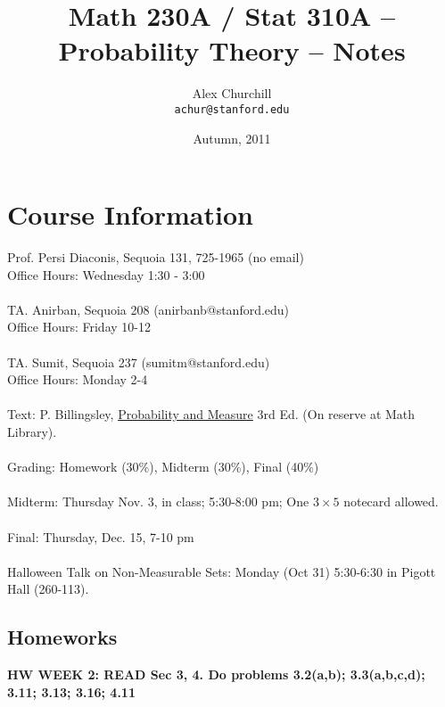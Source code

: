 \documentclass[12pt]{article}
\title{Math 230A / Stat 310A -- Probability Theory -- Notes}
\author{
Alex Churchill\\
\small \texttt{achur@stanford.edu}
}
\date{Autumn, 2011}
\begin{document}
\maketitle
\thispagestyle{empty} %
\tableofcontents


\newpage

\setcounter{page}{1} %

\section{Course Information}
Prof. Persi Diaconis, Sequoia 131, 725-1965 (no email) \\
Office Hours: Wednesday 1:30 - 3:00
\\ \\
TA. Anirban, Sequoia 208 (anirbanb@stanford.edu) \\
Office Hours: Friday 10-12
\\ \\
TA. Sumit, Sequoia 237 (sumitm@stanford.edu) \\
Office Hours: Monday 2-4
\\ \\
Text: P. Billingsley, \underline{Probability and Measure} 3rd Ed. (On reserve at Math Library).
\\ \\
Grading: Homework (30\%), Midterm (30\%), Final (40\%)
\\ \\
Midterm: Thursday Nov. 3, in class; 5:30-8:00 pm; One $3 \times 5$ notecard allowed.
\\ \\
Final: Thursday, Dec. 15, 7-10 pm
\\ \\
Halloween Talk on Non-Measurable Sets: Monday (Oct 31) 5:30-6:30 in Pigott Hall (260-113).

\subsection{Homeworks}

{\bf HW WEEK 2: READ Sec 3, 4.  Do problems 3.2(a,b); 3.3(a,b,c,d); 3.11; 3.13; 3.16; 4.11}
\end{document}

